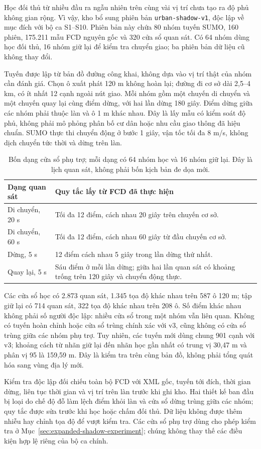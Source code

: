 Học đối thủ từ nhiều đầu ra ngẫu nhiên trên cùng vài vị trí chưa tạo ra độ phủ không gian rộng. Vì vậy, kho bổ sung phiên bản \texttt{urban-shadow-v1}, độc lập về mục đích với bộ ca S1--S10. Phiên bản này chứa 80 nhóm tuyến SUMO, 160 phiên, 175.211 mẫu FCD nguyên gốc và 320 cửa sổ quan sát. Có 64 nhóm dùng học đối thủ, 16 nhóm giữ lại để kiểm tra chuyển giao; ba phiên bản dữ liệu cũ không thay đổi.

Tuyến được lập từ bản đồ đường công khai, không dựa vào vị trí thật của nhóm cần đánh giá. Chọn ô xuất phát 120 m không hoàn lại; đường đi cơ sở dài 2,5--4 km, có ít nhất 12 cạnh ngoài nút giao. Mỗi nhóm gồm một chuyến di chuyển và một chuyến quay lại cùng điểm dừng, với hai lần dừng 180 giây. Điểm dừng giữa các nhóm phải thuộc làn và ô 1 m khác nhau. Đây là lấy mẫu có kiểm soát độ phủ, không phải mô phỏng phân bố cư dân hoặc nhu cầu giao thông đã hiệu chuẩn. SUMO thực thi chuyển động ở bước 1 giây, vận tốc tối đa 8 m/s, không dịch chuyển tức thời và dừng trên làn.~\citep{sumotrip}

\begin{table}[htbp]
\centering\small
\caption{Bốn dạng cửa sổ phụ trợ; mỗi dạng có 64 nhóm học và 16 nhóm giữ lại. Đây là lịch quan sát, không phải bốn kịch bản đe dọa mới.}
\label{tab:auxiliary-profiles}
\begin{tabularx}{\textwidth}{p{2.6cm}X}
\toprule
Dạng quan sát & Quy tắc lấy từ FCD đã thực hiện\\
\midrule
Di chuyển, 20 s & Tối đa 12 điểm, cách nhau 20 giây trên chuyến cơ sở.\\
Di chuyển, 60 s & Tối đa 12 điểm, cách nhau 60 giây từ đầu chuyến cơ sở.\\
Dừng, 5 s & 12 điểm cách nhau 5 giây trong lần dừng thứ nhất.\\
Quay lại, 5 s & Sáu điểm ở mỗi lần dừng; giữa hai lần quan sát có khoảng trống trên 120 giây và chuyển động thực.\\
\bottomrule
\end{tabularx}
\end{table}

Các cửa sổ học có 2.873 quan sát, 1.345 tọa độ khác nhau trên 587 ô 120 m; tập giữ lại có 714 quan sát, 322 tọa độ khác nhau trên 208 ô. Số điểm khác nhau không phải số người độc lập: nhiều cửa sổ trong một nhóm vẫn liên quan. Không có tuyến hoàn chỉnh hoặc cửa sổ trùng chính xác với v3, cũng không có cửa sổ trùng giữa các nhóm phụ trợ. Tuy nhiên, các tuyến mới dùng chung 901 cạnh với v3; khoảng cách từ nhãn giữ lại đến nhãn học gần nhất có trung vị 30,47 m và phân vị 95 là 159,59 m. Đây là kiểm tra trên cùng bản đồ, không phải tổng quát hóa sang vùng địa lý mới.

Kiểm tra độc lập đối chiếu toàn bộ FCD với XML gốc, tuyến tới đích, thời gian dừng, liên tục thời gian và vị trí trên làn trước khi ghi kho. Hai thiết kế ban đầu bị loại do chế độ đỗ làm lệch điểm khỏi làn và cửa sổ dừng trùng giữa các nhóm; quy tắc được sửa trước khi học hoặc chấm đối thủ. Dữ liệu không được thêm nhiễu hay chỉnh tọa độ để vượt kiểm tra. Các cửa sổ phụ trợ dùng cho phép kiểm tra ở Mục~\ref{sec:expanded-shadow-experiment}; chúng không thay thế các điều kiện hợp lệ riêng của bộ ca chính.

